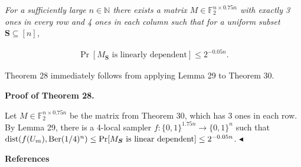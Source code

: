 \emph{For a sufficiently large $n\in\mathbb{N}$ there exists a matrix $M\in\mathbb{F}_{2}^{n\times 0.75n}$ with exactly 3 ones in every row and 4 ones in each column such that for a uniform subset $\boldsymbol{S}\subseteq[n]$,}\par


\[\begin{gathered}
\Pr[\text{$M_{\boldsymbol{S}}$ is linearly dependent}]\leq 2^{-0.05n}.
\end{gathered}\]






Theorem 28 immediately follows from applying Lemma 29 to Theorem 30.\par





\par\medskip\noindent\textbf{Proof of Theorem 28.}\par




Let $M\in\mathbb{F}_{2}^{n\times 0.75n}$ be the matrix from Theorem 30, which has 3 ones in each row.
By Lemma 29, there is a 4-local sampler $f\colon\{0,1\}^{1.75n}\to\{0,1\}^{n}$ such that $\mathrm{dist}(f(U_{m}),\textnormal{Ber}(1/4)^{n})\leq\Pr[\text{$M_{\boldsymbol{S}}$ is linear dependent}]\leq 2^{-0.05n}$.
$\blacktriangleleft$\par






\par\medskip\noindent\textbf{References}\par



